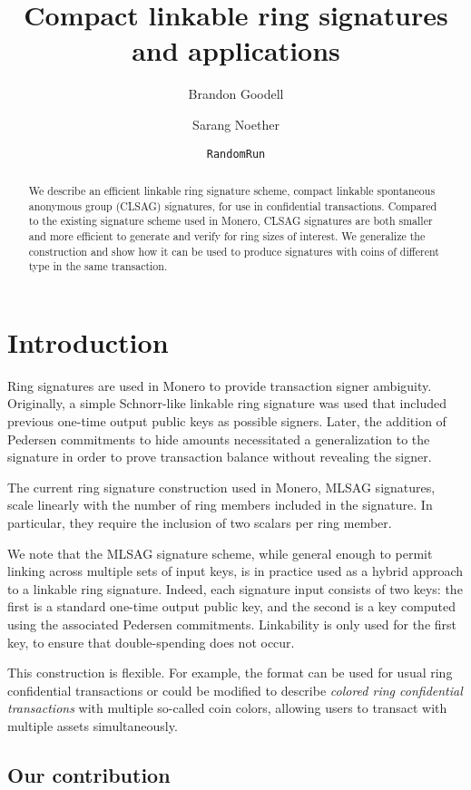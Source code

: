 \documentclass{article}
\title{Compact linkable ring signatures and applications}
\author[1]{Brandon Goodell}
\author[1]{Sarang Noether}
\author[2]{\texttt{RandomRun}}
\affil[1]{Monero Research Lab, \texttt{\{surae,sarang\}@getmonero.org}}
\affil[2]{Independent researcher}
\date{}
\theoremstyle{plain}
\theoremstyle{definition}
\begin{document}
\maketitle

\begin{abstract}
We describe an efficient linkable ring signature scheme, compact linkable spontaneous anonymous group (CLSAG) signatures, for use in confidential transactions. Compared to the existing signature scheme used in Monero, CLSAG signatures are both smaller and more efficient to generate and verify for ring sizes of interest. We generalize the construction and show how it can be used to produce signatures with coins of different type in the same transaction.
\end{abstract}


\section{Introduction}
Ring signatures are used in Monero to provide transaction signer ambiguity. Originally, a simple Schnorr-like linkable ring signature \cite{liu2004linkable} was used that included previous one-time output public keys as possible signers. Later, the addition of Pedersen commitments to hide amounts necessitated a generalization to the signature \cite{noether2016ring} in order to prove transaction balance without revealing the signer.

The current ring signature construction used in Monero, MLSAG signatures, scale linearly with the number of ring members included in the signature. In particular, they require the inclusion of two scalars per ring member.

We note that the MLSAG signature scheme, while general enough to permit linking across multiple sets of input keys, is in practice used as a hybrid approach to a linkable ring signature. Indeed, each signature input consists of two keys: the first is a standard one-time output public key, and the second is a key computed using the associated Pedersen commitments. Linkability is only used for the first key, to ensure that double-spending does not occur.

This construction is flexible. For example, the format can be used for usual ring confidential transactions or could be modified to describe \textit{colored ring confidential transactions} with multiple so-called coin colors, allowing users to transact with multiple assets simultaneously.


\subsection{Our contribution}
\end{document}
